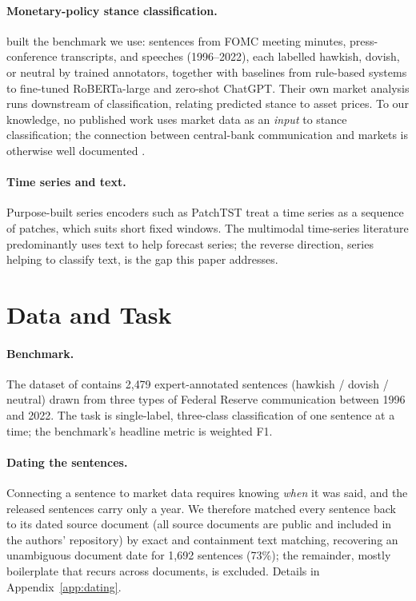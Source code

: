 \documentclass[11pt]{article}
\begin{document}
\paragraph{Monetary-policy stance classification.}
\citet{shah2023trillion} built the benchmark we use: sentences from FOMC meeting minutes, press-conference transcripts, and speeches (1996--2022), each labelled hawkish, dovish, or neutral by trained annotators, together with baselines from rule-based systems to fine-tuned RoBERTa-large and zero-shot ChatGPT. Their own market analysis runs downstream of classification, relating predicted stance to asset prices. To our knowledge, no published work uses market data as an \emph{input} to stance classification; the connection between central-bank communication and markets is otherwise well documented \citep{tetlock2007giving,barber2008glitters}.

\paragraph{Time series and text.}
Purpose-built series encoders such as PatchTST \citep{nie2023patchtst} treat a time series as a sequence of patches, which suits short fixed windows. The multimodal time-series literature predominantly uses text to help forecast series; the reverse direction, series helping to classify text, is the gap this paper addresses.


\section{Data and Task}
\label{sec:data}

\paragraph{Benchmark.}
The dataset of \citet{shah2023trillion} contains 2{,}479 expert-annotated sentences (hawkish / dovish / neutral) drawn from three types of Federal Reserve communication between 1996 and 2022. The task is single-label, three-class classification of one sentence at a time; the benchmark's headline metric is weighted F1.

\paragraph{Dating the sentences.}
Connecting a sentence to market data requires knowing \emph{when} it was said, and the released sentences carry only a year. We therefore matched every sentence back to its dated source document (all source documents are public and included in the authors' repository) by exact and containment text matching, recovering an unambiguous document date for 1{,}692 sentences (73\%); the remainder, mostly boilerplate that recurs across documents, is excluded. Details in Appendix~\ref{app:dating}.
\end{document}
